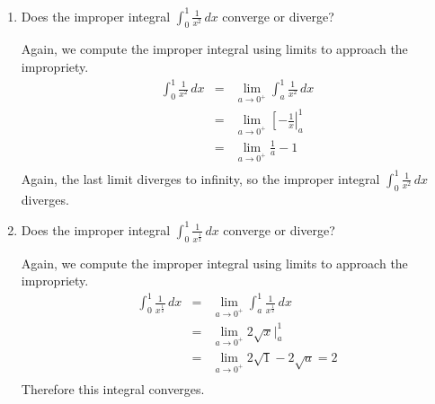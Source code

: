 \documentclass[main]{subfiles}
\begin{document}
\begin{enumerate}
\begin{enumerate}
\begin{solution}
      \begin{eqnarray*}
        \int_0^1 \frac{1}{x}\,dx  
        &=& \lim_{a\rightarrow 0^+} \int_a^1 \frac{1}{x}\,dx \\        
        &=& \lim_{a\rightarrow 0^+} \left[ \ln x \right|_a^1 \\
        &=& \lim_{a\rightarrow 0^+} \ln 1 - \ln a \\
        &=& \lim_{a\rightarrow 0^+} -\ln a
      \end{eqnarray*}  

      This final limit diverges to infinity, and so the improper integral diverges.
    \end{solution}

  \item 
  \begin{problem}[\vfill]
    Does the improper integral $\displaystyle \int_0^1 \frac{1}{x^2} \,dx$ converge or diverge?
  \end{problem}


  \begin{solution}
    Again, we compute the improper integral using limits to approach the impropriety.
    \begin{eqnarray*}
        \int_0^1 \frac{1}{x^2}\,dx  
        &=& \lim_{a\rightarrow 0^+} \int_a^1 \frac{1}{x^2}\,dx \\        
        &=& \lim_{a\rightarrow 0^+} \left[ -\frac{1}{x} \right|_a^1 \\
        &=& \lim_{a\rightarrow 0^+} \frac{1}{a} - 1 \\
    \end{eqnarray*}
    Again, the last limit diverges to infinity, so the improper integral $\displaystyle \int_0^1 \frac{1}{x^2}\,dx$ diverges.
  \end{solution}  
\pspace{\newpage}
  \item   \begin{problem}[\vfill]
    Does the improper integral $\displaystyle \int_0^1 \frac{1}{x^\frac{1}{2}} \,dx$ converge or diverge?
  \end{problem}

  \begin{solution}
      Again, we compute the improper integral using limits to approach the impropriety.
    \begin{eqnarray*}
        \int_0^1 \frac{1}{x^\frac{1}{2}}\,dx  
        &=& \lim_{a\rightarrow 0^+} \int_a^1 \frac{1}{x^{\frac{1}{2}}}\,dx \\        
        &=& \lim_{a\rightarrow 0^+} 2\sqrt{x} \vert _a^1 \\
        &=& \lim_{a\rightarrow 0^+} 2\sqrt{1} - 2\sqrt{a}=2 \\
    \end{eqnarray*}
    Therefore this integral converges.
  \end{solution}
  \end{enumerate}
  

\end{enumerate}
\end{document}
